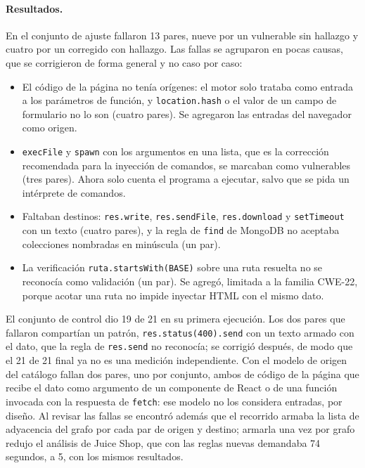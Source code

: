 \paragraph{Resultados.} En el conjunto de ajuste fallaron 13 pares, nueve
por un vulnerable sin hallazgo y cuatro por un corregido con hallazgo. Las
fallas se agruparon en pocas causas, que se corrigieron de forma general
y no caso por caso:

\begin{itemize}
    \item El código de la página no tenía orígenes: el motor solo trataba
    como entrada a los parámetros de función, y \texttt{location.hash} o
    el valor de un campo de formulario no lo son (cuatro pares). Se
    agregaron las entradas del navegador como origen.
    \item \texttt{execFile} y \texttt{spawn} con los argumentos en una
    lista, que es la corrección recomendada para la inyección de comandos,
    se marcaban como vulnerables (tres pares). Ahora solo cuenta el
    programa a ejecutar, salvo que se pida un intérprete de comandos.
    \item Faltaban destinos: \texttt{res.write}, \texttt{res.sendFile},
    \texttt{res.download} y \texttt{setTimeout} con un texto (cuatro
    pares), y la regla de \texttt{find} de MongoDB no aceptaba colecciones
    nombradas en minúscula (un par).
    \item La verificación \texttt{ruta.startsWith(BASE)} sobre una ruta
    resuelta no se reconocía como validación (un par). Se agregó, limitada
    a la familia CWE-22, porque acotar una ruta no impide inyectar HTML con
    el mismo dato.
\end{itemize}

El conjunto de control dio 19 de 21 en su primera ejecución. Los dos
pares que fallaron compartían un patrón, \texttt{res.status(400).send}
con un texto armado con el dato, que la regla de \texttt{res.send} no
reconocía; se corrigió después, de modo que el 21 de 21 final ya no es una
medición independiente. Con el modelo de origen del catálogo fallan dos
pares, uno por conjunto, ambos de código de la página que recibe el dato
como argumento de un componente de React o de una función invocada con
la respuesta de \texttt{fetch}: ese modelo no los considera entradas, por
diseño. Al revisar las fallas se encontró además que el recorrido armaba
la lista de adyacencia del grafo por cada par de origen y destino;
armarla una vez por grafo redujo el análisis de Juice Shop, que con las
reglas nuevas demandaba 74 segundos, a 5, con los mismos resultados.


